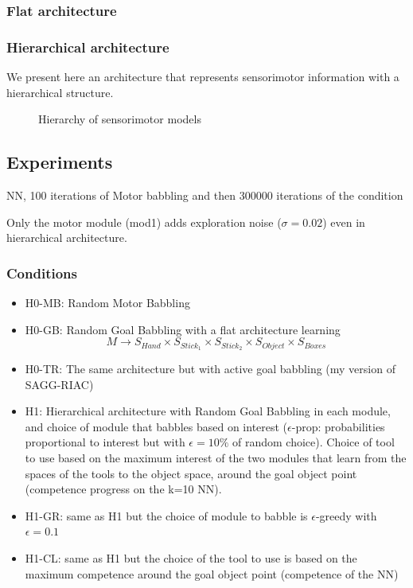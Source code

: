 \documentclass[10pt,letterpaper]{article}
\begin{document}
				
		
		\subsubsection{Flat architecture}
			
				
		
		\subsubsection{Hierarchical architecture}
			
			We present here an architecture that represents sensorimotor information with a hierarchical structure.
			
			\begin{figure}[t]
				\center
				
				\caption{Hierarchy of sensorimotor models}
				\label{H}					
			\end{figure}

				
		

	
	\subsection{Experiments}
		
		NN, 100 iterations of Motor babbling and then 300000 iterations of the condition
		
		Only the motor module (mod1) adds exploration noise ($\sigma=0.02$) even in hierarchical architecture.
		
		\subsubsection{Conditions}
			
			\begin{itemize}
			
				\item H0-MB: Random Motor Babbling
				\item H0-GB: Random Goal Babbling with a flat architecture learning $$M \rightarrow S_{Hand} \times S_{Stick_1} \times S_{Stick_2} \times S_{Object} \times S_{Boxes}$$
				\item H0-TR: The same architecture but with active goal babbling (my version of SAGG-RIAC)
				\item H1: Hierarchical architecture with Random Goal Babbling in each module, and choice of module that babbles based on interest ($\epsilon$-prop: probabilities proportional to interest but with $\epsilon=10\%$ of random choice). Choice of tool to use based on the maximum interest of the two modules that learn from the spaces of the tools to the object space, around the goal object point (competence progress on the k=10 NN).
				\item H1-GR: same as H1 but the choice of module to babble is $\epsilon$-greedy with $\epsilon=0.1$
				\item H1-CL: same as H1 but the choice of the tool to use is based on the maximum competence around the goal object point (competence of the NN)
			
			\end{itemize}
				
\end{document}
